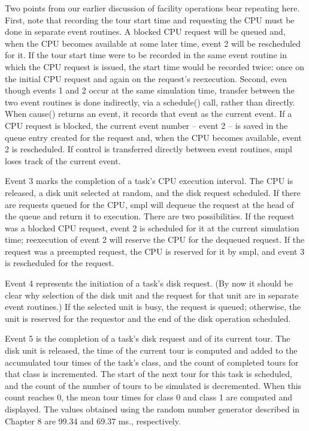 Two points from our earlier discussion of facility operations bear repeating
here. First, note that recording the tour start time and requesting the CPU
must be done in separate event routines. A blocked CPU request will be queued
and, when the CPU becomes available at some later time, event 2 will be
rescheduled for it. If the tour start time were to be recorded in the same
event routine in which the CPU request is issued, the start time would be
recorded twice: once on the initial CPU request and again on the request's
reexecution. Second, even though events 1 and 2 occur at the same simulation
time, transfer between the two event routines is done indirectly, via a
schedule() call, rather than directly. When cause() returns an event, it
records that event as the current event. If a CPU request is blocked, the
current event number -- event 2 -- is saved in the queue entry created for the
request and, when the CPU becomes available, event 2 is rescheduled. If
control is transferred directly between event routines, smpl loses track of the
current event.

Event 3 marks the completion of a task's CPU execution interval. The CPU is
released, a disk unit selected at random, and the disk request scheduled. If
there are requests queued for the CPU, smpl will dequeue the request at the
head of the queue and return it to execution. There are two possibilities. If
the request was a blocked CPU request, event 2 is scheduled for it at the
current simulation time; reexecution of event 2 will reserve the CPU for the
dequeued request. If the request was a preempted request, the CPU is reserved
for it by smpl, and event 3 is rescheduled for the request.

Event 4 represents the initiation of a task's disk request. (By now it should
be clear why selection of the disk unit and the request for that unit are in
separate event routines.) If the selected unit is busy, the request is queued;
otherwise, the unit is reserved for the requestor and the end of the disk
operation scheduled.

Event 5 is the completion of a task's disk request and of its current tour. The
disk unit is released, the time of the current tour is computed and added to
the accumulated tour times of the task's class, and the count of completed
tours for that class is incremented. The start of the next tour for this task is
scheduled, and the count of the number of tours to be simulated is
decremented. When this count reaches 0, the mean tour times for class 0 and
class 1 are computed and displayed. The values obtained using the random
number generator described in Chapter 8 are 99.34 and 69.37 ms.,
respectively.

